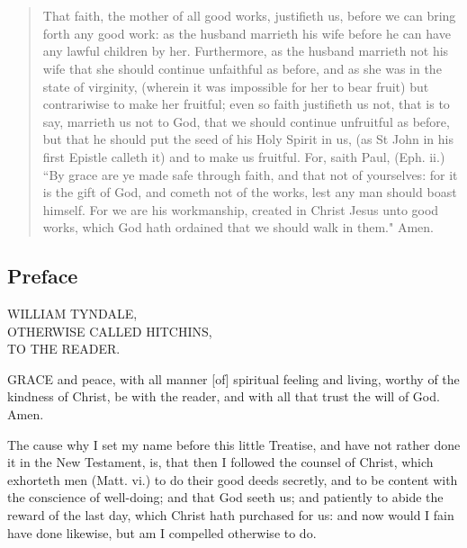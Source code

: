 \section*{}

\begin{abstract}
That faith, the mother of all good works, justifieth us, before we can bring 
forth any good work: as the husband marrieth his wife before he can have 
any lawful children by her. Furthermore, as the husband marrieth not 
his wife that she should continue unfaithful as before, and as she was in 
the state of virginity, (wherein it was impossible for her to bear fruit) but 
contrariwise to make her fruitful; even so faith justifieth us not, that is to 
say, marrieth us not to God, that we should continue unfruitful as before, 
but that he should put the seed of his Holy Spirit in us, (as St John in his 
first Epistle calleth it) and to make us fruitful. For, saith Paul, (Eph. ii.) 
``By grace are ye made safe through faith, and that not of yourselves: for 
it is the gift of God, and cometh not of the works, lest any man should 
boast himself. For we are his workmanship, created in Christ Jesus unto 
good works, which God hath ordained that we should walk in them." Amen. 
\end{abstract}


\subsection*{Preface}
\begin{center}
WILLIAM TYNDALE,\\
OTHERWISE CALLED HITCHINS,\\
TO THE READER. 
\end{center}



GRACE and peace, with all manner [of]
spiritual feeling and living, worthy of the
kindness of Christ, be with the reader, and with 
all that trust the will of God. Amen. 

The cause why I set my name before this
little Treatise, and have not rather done it in
the New Testament, is, that then I followed
the counsel of Christ, which exhorteth men
(Matt. vi.) to do their good deeds secretly, and
to be content with the conscience of well-doing; 
and that God seeth us; and patiently to abide 
the reward of the last day, which Christ hath 
purchased for us: and now would I fain have 
done likewise, but am I compelled otherwise 
to do. 

